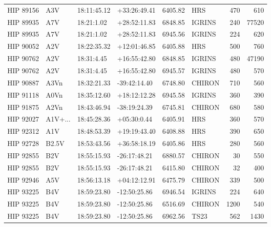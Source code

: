 \documentclass{emulateapj}
\begin{document}
\begin{longtable*}{|l|lllrlrr|}
   HIP 89156 &            A3V &    18:11:45.12 &   +33:26:49.41 &  6405.82 &        HRS &      470 &     610 \\
   HIP 89935 &            A7V &     18:21:1.02 &   +28:52:11.83 &  6848.85 &     IGRINS &      240 &   77520 \\
   HIP 89935 &            A7V &     18:21:1.02 &   +28:52:11.83 &  6945.56 &     IGRINS &      224 &     620 \\
   HIP 90052 &            A2V &    18:22:35.32 &   +12:01:46.85 &  6405.88 &        HRS &      500 &     760 \\
   HIP 90762 &            A2V &     18:31:4.45 &   +16:55:42.80 &  6848.85 &     IGRINS &      480 &   47190 \\
   HIP 90762 &            A2V &     18:31:4.45 &   +16:55:42.80 &  6945.57 &     IGRINS &      480 &     570 \\
   HIP 90887 &           A3Vn &    18:32:21.33 &   -39:42:14.40 &  6748.80 &     CHIRON &      710 &     560 \\
   HIP 91118 &           A0Vn &    18:35:12.60 &   +18:12:12.28 &  6945.58 &     IGRINS &      360 &     390 \\
   HIP 91875 &           A2Vn &    18:43:46.94 &   -38:19:24.39 &  6745.81 &     CHIRON &      680 &     580 \\
   HIP 92027 &        A1V+... &    18:45:28.36 &    +05:30:0.44 &  6405.91 &        HRS &      360 &     570 \\
   HIP 92312 &            A1V &    18:48:53.39 &   +19:19:43.40 &  6408.88 &        HRS &      390 &     650 \\
   HIP 92728 &          B2.5V &    18:53:43.56 &   +36:58:18.19 &  6405.86 &        HRS &      280 &     560 \\
   HIP 92855 &            B2V &    18:55:15.93 &   -26:17:48.21 &  6880.57 &     CHIRON &       30 &     550 \\
   HIP 92855 &            B2V &    18:55:15.93 &   -26:17:48.21 &  6415.80 &     CHIRON &       32 &     400 \\
   HIP 92946 &            A5V &    18:56:13.18 &   +04:12:12.91 &  6475.79 &     CHIRON &      339 &     500 \\
   HIP 93225 &            B4V &    18:59:23.80 &   -12:50:25.86 &  6946.54 &     IGRINS &      224 &     640 \\
   HIP 93225 &            B4V &    18:59:23.80 &   -12:50:25.86 &  6516.69 &     CHIRON &     1200 &     540 \\
   HIP 93225 &            B4V &    18:59:23.80 &   -12:50:25.86 &  6962.56 &       TS23 &      562 &    1430 \\

\end{longtable*}
\end{document}
